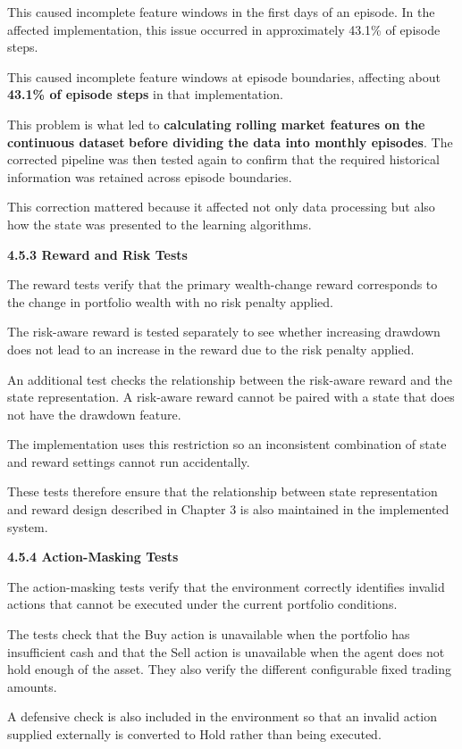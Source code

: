 This caused incomplete feature windows in the first days of an episode.
In the affected implementation, this issue occurred in approximately
43.1\% of episode steps.

This caused incomplete feature windows at episode boundaries, affecting
about \textbf{43.1\% of episode steps} in that implementation.

This problem is what led to \textbf{calculating rolling market features
on the continuous dataset} \textbf{before dividing the data into monthly
episodes}. The corrected pipeline was then tested again to confirm that
the required historical information was retained across episode
boundaries.

This correction mattered because it affected not only data processing
but also how the state was presented to the learning algorithms.

\textbf{4.5.3 Reward and Risk Tests}

The reward tests verify that the primary wealth-change reward
corresponds to the change in portfolio wealth with no risk penalty
applied.

The risk-aware reward is tested separately to see whether increasing
drawdown does not lead to an increase in the reward due to the risk
penalty applied.

An additional test checks the relationship between the risk-aware reward
and the state representation. A risk-aware reward cannot be paired with
a state that does not have the drawdown feature.

The implementation uses this restriction so an inconsistent combination
of state and reward settings cannot run accidentally.

These tests therefore ensure that the relationship between state
representation and reward design described in Chapter 3 is also
maintained in the implemented system.

\textbf{4.5.4 Action-Masking Tests}

The action-masking tests verify that the environment correctly
identifies invalid actions that cannot be executed under the current
portfolio conditions.

The tests check that the Buy action is unavailable when the portfolio
has insufficient cash and that the Sell action is unavailable when the
agent does not hold enough of the asset. They also verify the different
configurable fixed trading amounts.

A defensive check is also included in the environment so that an invalid
action supplied externally is converted to Hold rather than being
executed.


